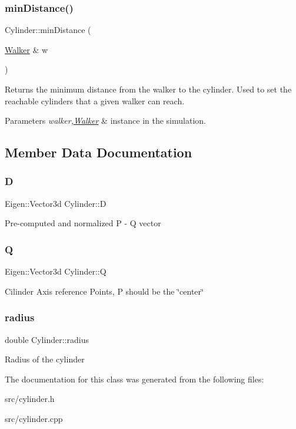 \subsubsection{\texorpdfstring{min\+Distance()}{minDistance()}}
{\footnotesize\ttfamily Cylinder\+::min\+Distance (\begin{DoxyParamCaption}\item[{\hyperlink{class_walker}{Walker} \&}]{w }\end{DoxyParamCaption})}



Returns the minimum distance from the walker to the cylinder. Used to set the reachable cylinders that a given walker can reach. 


\begin{DoxyParams}{Parameters}
{\em walker,\hyperlink{class_walker}{Walker}} & instance in the simulation. \\
\hline
\end{DoxyParams}


\subsection{Member Data Documentation}
\mbox{\label{class_cylinder_a2e7f0d4e406cc50daf30f3e3b0be1609}} 
\subsubsection{\texorpdfstring{D}{D}}
{\footnotesize\ttfamily Eigen\+::\+Vector3d Cylinder\+::D}

Pre-\/computed and normalized P -\/ Q vector \mbox{\label{class_cylinder_a9f367beb008c847b97bb0ce043601769}} 
\subsubsection{\texorpdfstring{Q}{Q}}
{\footnotesize\ttfamily Eigen\+::\+Vector3d Cylinder\+::Q}

Cilinder Axis reference Points, P should be the \char`\"{}center\char`\"{} \mbox{\label{class_cylinder_a8a825799285bcf60b49b8aef0459b498}} 
\subsubsection{\texorpdfstring{radius}{radius}}
{\footnotesize\ttfamily double Cylinder\+::radius}

Radius of the cylinder 

The documentation for this class was generated from the following files\+:\begin{DoxyCompactItemize}
\item 
src/cylinder.\+h\item 
src/cylinder.\+cpp\end{DoxyCompactItemize}

